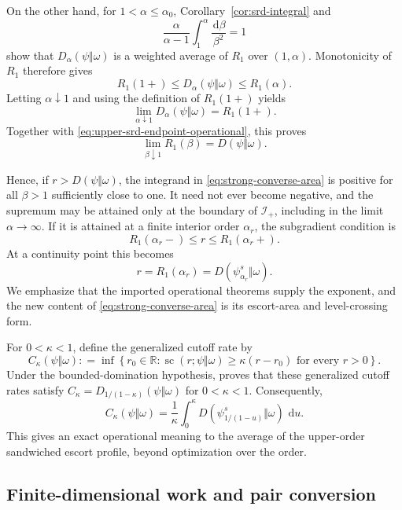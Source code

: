 \documentclass[12pt]{article}
\numberwithin{equation}{section}
\theoremstyle{definition}
\theoremstyle{remark}
\newcommand{\dd}{\,\mathrm d}
\newcommand{\scal}{\operatorname{sc}}
\newcommand{\?}{\overset{?}{=}}
\newcommand{\defeq}{\mathrel{\mathop:}=}
\begin{document}
On the other hand, for $1<\alpha\leq\alpha_0$,
Corollary~\ref{cor:srd-integral} and
\[
  \frac{\alpha}{\alpha-1}
  \int_1^\alpha\frac{\dd\beta}{\beta^2}=1
\]
show that $D_\alpha(\psi\Vert\omega)$ is a weighted average of
$R_1$ over $(1,\alpha)$.  Monotonicity of $R_1$ therefore gives
\[
  R_1(1+)
  \leq
  D_\alpha(\psi\Vert\omega)
  \leq
  R_1(\alpha).
\]
Letting $\alpha\downarrow1$ and using the definition of $R_1(1+)$ yields
\[
  \lim_{\alpha\downarrow1}
  D_\alpha(\psi\Vert\omega)
  =
  R_1(1+).
\]
Together with \eqref{eq:upper-srd-endpoint-operational}, this proves
\[
  \lim_{\beta\downarrow1}R_1(\beta)
  =
  D(\psi\Vert\omega).
\]

Hence, if $r>D(\psi\Vert\omega)$, the integrand in
\eqref{eq:strong-converse-area} is positive for all $\beta>1$ sufficiently
close to one.  It need not ever become negative, and the supremum may be
attained only at the boundary of $\mathcal I_+$, including in the limit
$\alpha\to\infty$.  If it is attained at a finite interior order
$\alpha_r$, the subgradient condition is
\[
  R_1(\alpha_r-)\leq r\leq R_1(\alpha_r+).
\]
At a continuity point this becomes
\begin{equation}
  r=R_1(\alpha_r)=D(\psi_{\alpha_r}^s\Vert\omega).
  \label{eq:strong-converse-level-crossing}
\end{equation}
We emphasize that the imported operational theorems
\cite{Mosonyi:2014wsq,Hiai:2021slp,Junge:2025kuz} supply the exponent, and the
new content of \eqref{eq:strong-converse-area} is its escort-area and
level-crossing form.

For $0<\kappa<1$, define the generalized cutoff rate by
\begin{equation}
  C_\kappa(\psi\Vert\omega)
  \defeq \inf\left\{r_0\in\mathbb R:
  \scal(r;\psi\Vert\omega)\geq\kappa(r-r_0)
  \text{ for every }r>0\right\}.
  \label{eq:cutoff-rate-definition}
\end{equation}
Under the bounded-domination hypothesis,
\cite{Junge:2025kuz} proves that these generalized cutoff rates
satisfy
$C_\kappa=D_{1/(1-\kappa)}(\psi\Vert\omega)$ for $0<\kappa<1$.
Consequently,
\begin{equation}
  C_\kappa(\psi\Vert\omega)
  =\frac1\kappa\int_0^\kappa
   D\!\left(\psi_{1/(1-u)}^s\Vert\omega\right)\,\dd u.
  \label{eq:cutoff-rate-average}
\end{equation}
This gives an exact operational meaning to the average of the upper-order
sandwiched escort profile, beyond optimization over the order.

\subsection{Finite-dimensional work and pair conversion}
\end{document}

